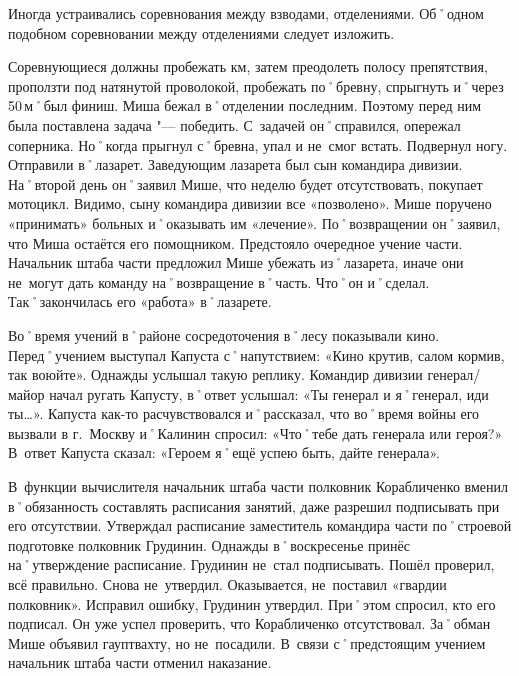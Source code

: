 Иногда устраивались соревнования между взводами, отделениями. Об˚одном подобном соревновании между отделениями следует изложить.

Соревнующиеся должны пробежать  км, затем преодолеть полосу препятствия, проползти под натянутой проволокой, пробежать по˚бревну, спрыгнуть и˚через 50\,м˚был финиш. Миша бежал в˚отделении последним. Поэтому перед ним была поставлена задача "--- победить. С~задачей он˚справился, опережал соперника. Но˚когда прыгнул с˚бревна, упал и не~смог встать. Подвернул ногу. Отправили в˚лазарет. Заведующим лазарета был сын командира дивизии. На˚второй день он˚заявил Мише, что неделю будет отсутствовать, покупает мотоцикл. Видимо, сыну командира дивизии все «позволено». Мише поручено «принимать» больных и˚оказывать им «лечение». По˚возвращении он˚заявил, что Миша остаётся его помощником. Предстояло очередное учение части. Начальник штаба части предложил Мише убежать из˚лазарета, иначе они не~могут дать команду на˚возвращение в˚часть. Что˚он и˚сделал. Так˚закончилась его «работа» в˚лазарете.

Во˚время учений в˚районе сосредоточения в˚лесу показывали кино. Перед˚учением выступал Капуста с˚напутствием: «Кино крутив, салом кормив, так воюйте». Однажды услышал такую реплику. Командир дивизии генерал\-/майор начал ругать Капусту, в˚ответ услышал: «Ты генерал и я˚генерал, иди ты…». Капуста как-то расчувствовался и˚рассказал, что во˚время войны его вызвали в г.~Москву и˚Калинин спросил: «Что˚тебе дать генерала или героя?» В~ответ Капуста сказал: «Героем я˚ещё успею быть, дайте генерала». 

В~функции вычислителя начальник штаба части полковник Корабличенко вменил в˚обязанность составлять расписания занятий, даже разрешил подписывать при его отсутствии. Утверждал расписание заместитель командира части по˚строевой подготовке полковник Грудинин. Однажды в˚воскресенье принёс на˚утверждение расписание. Грудинин не~стал подписывать. Пошёл проверил, всё правильно. Снова не~утвердил. Оказывается, не~поставил «гвардии полковник». Исправил ошибку, Грудинин утвердил. При˚этом спросил, кто его подписал. Он уже успел проверить, что Корабличенко отсутствовал. За˚обман Мише объявил гауптвахту, но не~посадили. В~связи с˚предстоящим учением начальник штаба части отменил наказание.


